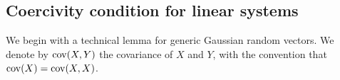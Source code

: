 \documentclass[]{elsarticle}
\def\thetaOU{\theta}
\newcommand{\mbf}[1]{\boldsymbol{#1}}
\newcommand{\bB}{\mbf{B}}
\newcommand{\bX}{\mbf{X}}
\newcommand{\bY}{\mbf{Y}}
\newcommand{\btheta}{\mbf{A}}
\numberwithin{equation}{section}
\numberwithin{theorem}{section}
\begin{document}


\subsection{Coercivity condition for linear systems}
We begin with a technical lemma for generic Gaussian random vectors. We denote by ${\rm cov}(X,Y)$ the covariance of $X$ and $Y$, with the convention that ${\rm cov}(X)= {\rm cov}(X,X)$. 
\end{document}
